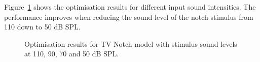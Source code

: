 

Figure~\ref{fig:TV_result_spl} shows the optimisation results for different
input sound intensities.  The performance improves when reducing the sound level
of the notch stimulus from 110 down to 50 dB SPL.
\begin{figure}[!h]
  \centering
  \caption{Optimisation results for TV Notch model with stimulus sound levels at
    110, 90, 70 and 50 dB SPL.}
  \label{fig:TV_result_spl}
\end{figure}


